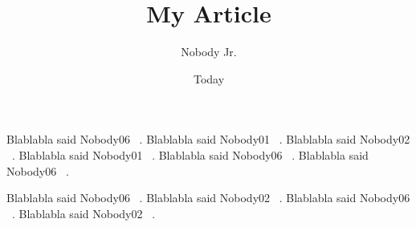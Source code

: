 \documentclass[11pt]{article}
\begin{document}
\title{My Article}
\author{Nobody Jr.}
\date{Today}
\maketitle

Blablabla said Nobody06 ~\cite{Nobody06}.
Blablabla said Nobody01 ~\cite{Nobody01}.
Blablabla said Nobody02 ~\cite{Nobody02}.
Blablabla said Nobody01 ~\cite{Nobody01}.
Blablabla said Nobody06 ~\cite{Nobody06}.
Blablabla said Nobody06 ~\cite{Nobody06}.

Blablabla said Nobody06 ~\cite{Nobody06}.
Blablabla said Nobody02 ~\cite{Nobody02}.
Blablabla said Nobody06 ~\cite{Nobody06}.
Blablabla said Nobody02 ~\cite{Nobody02}.

{}
%

\end{document}
